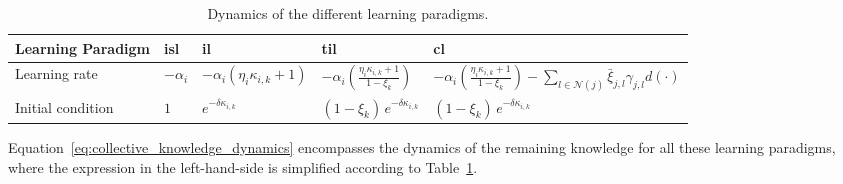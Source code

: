 \documentclass[12pt]{article}
\begin{document}
\begin{table}[!t]
    \caption{Dynamics of the different learning paradigms.\label{tab:learning_paradigms_expressions}}
    \begin{center}
        \begin{adjustbox}{width=\textwidth}
            \begin{tabular}{
                >{\raggedright\arraybackslash}p{4.5cm} 
                *{4}{>{\centering\arraybackslash}p{3.5cm}}
            }
                \toprule
                \textbf{Learning Paradigm} 
                & \textbf{\ac{isl}} 
                & \textbf{\ac{il}} 
                & \textbf{\ac{til}} 
                & \textbf{\ac{cl}} \\
                \midrule
                Learning rate 
                & $-\alpha_i$ 
                & $-\alpha_i\left(\eta_i \kappa_{i,k} + 1 \right)$ 
                & $-\alpha_i \left( \frac{\eta_i \kappa_{i,k} + 1}{1 - \xi_k} \right)$ 
                & $-\alpha_i \left( \frac{\eta_i \kappa_{i,k} + 1}{1 - \xi_k} \right) - \sum_{l \in \mathcal{N}(j)}\bar{\xi}_{j,l}\gamma_{j,l}d(\cdot)$ \\
                \addlinespace[0.5ex]
                Initial condition 
                & $1$ 
                & $e^{-\delta \kappa_{i,k}}$ 
                & $(1-\xi_k)\, e^{-\delta \kappa_{i,k}}$ 
                & $(1-\xi_k)\, e^{-\delta \kappa_{i,k}}$ \\
                \bottomrule
            \end{tabular}
        \end{adjustbox}
    \end{center}
\end{table}

Equation~\eqref{eq:collective_knowledge_dynamics} encompasses the dynamics of the remaining knowledge for all these learning paradigms, where the expression in the left-hand-side is simplified according to  Table~\ref{tab:learning_paradigms_expressions}. 
\end{document}
